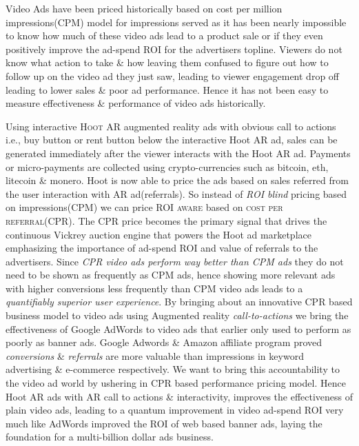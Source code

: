 Video Ads have been priced historically based on cost per million impressions(CPM) model for impressions served as it has been nearly impossible to know how much of these video ads lead to a product sale or if they even positively improve the ad-spend ROI for the advertisers topline. Viewers do not know what action to take \& how leaving them confused to figure out how to follow up on the video ad they just saw, leading to viewer engagement drop off leading to lower sales \& poor ad performance. Hence it has not been easy to measure effectiveness \& performance of video ads historically.

Using interactive \textsc{Hoot AR} augmented reality ads with obvious call to actions i.e., buy button or rent button below the interactive Hoot AR ad, sales can be generated immediately after the viewer interacts with the Hoot AR ad. Payments or micro-payments are collected using crypto-currencies such as bitcoin, eth, litecoin \& monero. Hoot is now able to price the ads based on sales referred from the user interaction with AR ad(referrals). So instead of \emph{ROI blind} pricing based on impressions(CPM) we can price \textsc{ROI aware} based on \textsc{cost per referral(CPR)}. The CPR price becomes the primary signal that drives the continuous Vickrey auction engine that powers the Hoot ad marketplace emphasizing the importance of ad-spend ROI and value of referrals to the advertisers. Since \emph{CPR video ads perform way better than CPM ads} they do not need to be shown as frequently as CPM ads, hence showing more relevant ads with higher conversions less frequently than CPM video ads leads to a \emph{quantifiably superior user experience}. By bringing about an innovative CPR based business model to video ads using Augmented reality \emph{call-to-actions} we bring the effectiveness of Google AdWords to video ads that earlier only used to perform as poorly as banner ads. Google Adwords \& Amazon affiliate program proved \emph{conversions} \& \emph{referrals} are more valuable than impressions in keyword advertising \& e-commerce respectively. We want to bring this accountability to the video ad world by ushering in CPR based performance pricing model. Hence Hoot AR ads with AR call to actions \& interactivity, improves the effectiveness of plain video ads, leading to a quantum improvement in video ad-spend ROI very much like AdWords improved the ROI of web based banner ads, laying the foundation for a multi-billion dollar ads business. 
